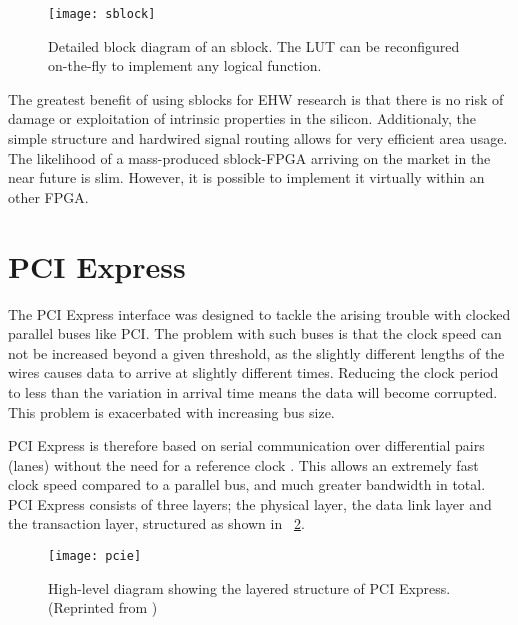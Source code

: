 \begin{figure}[!ht]
    \centering
    \texttt{[image: sblock]}
    \caption[Sblock]{
        Detailed block diagram of an sblock.
        The LUT can be reconfigured on-the-fly to implement any logical function.
    }
    \label{fig:sblock}
\end{figure}

The greatest benefit of using sblocks for EHW research is that there is no risk of damage or exploitation of intrinsic properties in the silicon.
Additionaly, the simple structure and hardwired signal routing allows for very efficient area usage.
The likelihood of a mass-produced sblock-FPGA arriving on the market in the near future is slim.
However, it is possible to implement it virtually within an other FPGA.

\section{PCI Express}

The PCI Express interface was designed to tackle the arising trouble with clocked parallel buses like PCI.
The problem with such buses is that the clock speed can not be increased beyond a given threshold, as the slightly different lengths of the wires causes data to arrive at slightly different times.
Reducing the clock period to less than the variation in arrival time means the data will become corrupted.
This problem is exacerbated with increasing bus size.

PCI Express is therefore based on serial communication over differential pairs (lanes\footnotemark) without the need for a reference clock \cite{pcie}.
This allows an extremely fast clock speed compared to a parallel bus, and much greater bandwidth in total.
PCI Express consists of three layers; the physical layer, the data link layer and the transaction layer, structured as shown in \figurename~\ref{fig:pcie}.

\begin{figure}[!ht]
    \centering
    \texttt{[image: pcie]}
    \caption[PCI Express structure]{
        High-level diagram showing the layered structure of PCI Express. (Reprinted from \cite{pcie})
    }
    \label{fig:pcie}
\end{figure}

